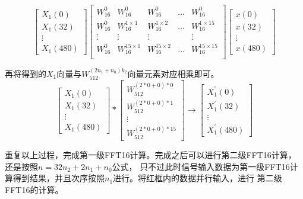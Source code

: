 \documentclass[12pt,a4paper]{article}
\begin{document}
\begin{equation}
\begin{bmatrix}
X_1(0) \\ X_1(32) \\ \vdots \\ X_1(480)
\end{bmatrix}
\begin{bmatrix}
W_{16}^0 & W_{16}^0 & W_{16}^0 &... &W_{16}^0 \\
W_{16}^0 & W_{16}^{1\times 1} & W_{16}^{1\times 2} &... &W_{16}^{1\times15} \\
\vdots &\vdots &\vdots &  &\vdots \\
W_{16}^0 & W_{16}^{15\times 1} & W_{16}^{15\times 2} &... &W_{16}^{15\times 15} \\
\end{bmatrix}
\begin{bmatrix}
x(0) \\ x(32) \\ \vdots \\ x(480)
\end{bmatrix}
\end{equation}

\noindent 再将得到的$X_1$向量与$W_{512}^{(2n_1+n_0)k_2}$向量元素对应相乘即可。
\begin{equation}
\begin{bmatrix}
X_1(0) \\ X_1(32) \\ \vdots \\ X_1(480)
\end{bmatrix}
*
\begin{bmatrix}
W_{512}^{(2*0+0)*0} \\ W_{512}^{(2*0+0)*1} \\ \vdots \\ W_{512}^{(2*0+0)*15}
\end{bmatrix}
\rightarrow
\begin{bmatrix}
X_1^{'}(0) \\ X_1^{'}(32) \\ \vdots \\ X_1^{'}(480)
\end{bmatrix}
\end{equation}

重复以上过程，完成第一级FFT16计算。完成之后可以进行第二级FFT16计算，还是按照$n=32n_2+2n_1+n_0$公式，
只不过此时信号输入数据为第一级FFT16计算得到结果，并且次序按照$n_1$进行。将红框内的数据并行输入，进行
第二级FFT16的计算。
\end{document}
